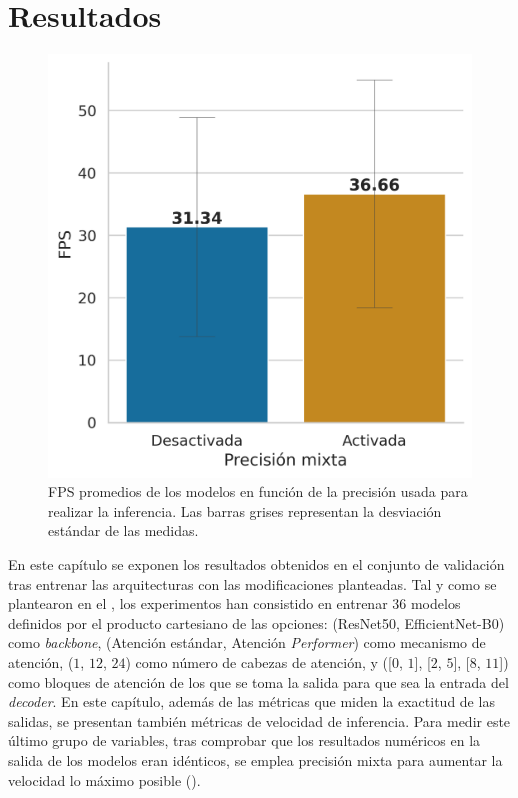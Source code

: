 \section{Resultados}

\begin{figure}
\vspace{-15pt}
\includegraphics[width=0.95\linewidth]{imagenes/Resultados/mixed_precision.png} 
\caption{FPS promedios de los modelos en función de la precisión usada para realizar la inferencia. Las barras grises representan la desviación estándar de las medidas.}
\label{fig:resultados-mixed-precision}
\end{figure}

En este capítulo se exponen los resultados obtenidos en el conjunto de validación tras entrenar las arquitecturas con las modificaciones planteadas. Tal y como se plantearon en el , los experimentos han consistido en entrenar $36$ modelos definidos por el producto cartesiano de las opciones: (ResNet50, EfficientNet-B0) como \textit{backbone}, (Atención estándar, Atención \textit{Performer}) como mecanismo de atención, ($1$, $12$, $24$) como número de cabezas de atención, y ([$0$, $1$], [$2$, $5$], [$8$, $11$]) como bloques de atención de los que se toma la salida para que sea la entrada del \textit{decoder}. En este capítulo, además de las métricas que miden la exactitud de las salidas, se presentan también métricas de velocidad de inferencia. Para medir este último grupo de variables, tras comprobar que los resultados numéricos en la salida de los modelos eran idénticos, se emplea precisión mixta para aumentar la velocidad lo máximo posible ().


